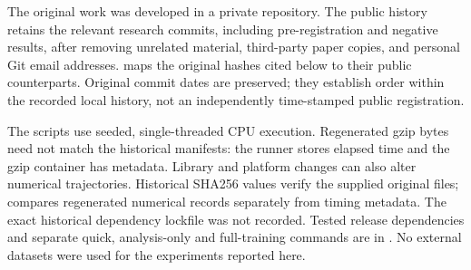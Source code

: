 \documentclass[11pt]{article}
\theoremstyle{definition}
\theoremstyle{remark}
\begin{document}
The original work was developed in a private repository. The public history
retains the relevant research commits, including pre-registration and negative
results, after removing unrelated material, third-party paper copies, and
personal Git email addresses.  maps the
original hashes cited below to their public counterparts. Original commit
dates are preserved; they establish order within the recorded local history,
not an independently time-stamped public registration.

The scripts use seeded, single-threaded CPU execution. Regenerated gzip bytes
need not match the historical manifests: the runner stores elapsed time and
the gzip container has metadata. Library and platform changes can also alter
numerical trajectories. Historical SHA256 values verify the supplied original
files;  compares regenerated numerical
records separately from timing metadata. The exact historical dependency
lockfile was not recorded. Tested release dependencies and separate quick,
analysis-only and full-training commands are in .
No external datasets were used for the experiments reported here.
\end{document}
